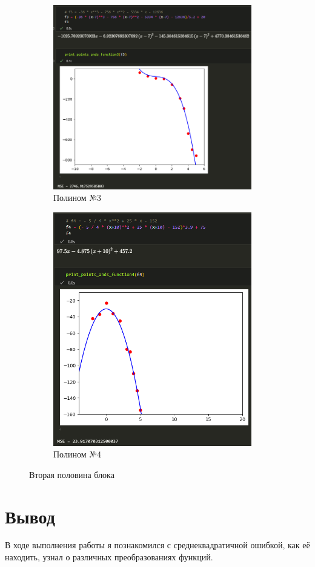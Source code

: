 \documentclass[14pt,a4paper]{extarticle}
\begin{document}
\begin{figure}[ht!]
    \begin{subfigure}{.5\textwidth}
        \centering
        \includegraphics[width=0.95\textwidth]{figures/3.4 3.png}
        \caption{Полином №3}
        \label{fig:3.4-3}
    \end{subfigure}%
    \begin{subfigure}{.5\textwidth}
        \centering
        \includegraphics[width=0.95\textwidth]{figures/3.4 4.png}
        \caption{Полином №4}
        \label{fig:3.4-4}
    \end{subfigure}%
    \caption{Вторая половина блока}
    \label{fig:3.4block2-2}
\end{figure}

\section*{Вывод}

        В ходе выполнения работы я познакомился с среднеквадратичной
ошибкой, как её находить, узнал о различных преобразованиях функций.
\end{document}
